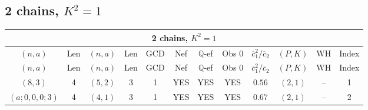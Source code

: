 \subsection{2 chains, $K^2 = 1$}
\begin{longtable}{|c|c|c|c|c|c|c|c|c|c|c|c|}
\hline
\multicolumn{12}{|c|}{2 chains, $K^2 = 1$}\\
\hline
$(n,a)$ & Len & $(n,a)$ & Len & GCD & Nef & $\mathbb Q$-ef & Obs 0 & $\overline c_1^2 / \overline c_2$ & $(P,K)$ & WH & Index\\
\hline
\endfirsthead

\hline
$(n,a)$ & Len & $(n,a)$ & Len & GCD & Nef & $\mathbb Q$-ef & Obs 0 & $\overline c_1^2 / \overline c_2$ & $(P,K)$ & WH & Index\\
\hline
\endhead
\hline
\endfoot

$(8,3)$ & 4 & $(5,2)$ & 3 & 1 & YES & YES & YES & $0.56$ & $(2,1)$ & -- & 1\\
$(a;0,0,0;3)$ & 4 & $(4,1)$ & 3 & 1 & YES & YES & YES & $0.67$ & $(2,1)$ & -- & 2
\end{longtable}
